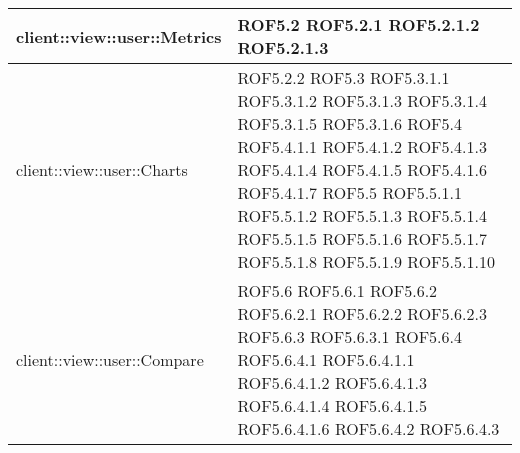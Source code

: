 \begin{center}
\begin{longtable}{| p{11cm} | p{2.5cm} |}
\hline
client::view::user::Metrics & ROF5.2 \newline ROF5.2.1 \newline ROF5.2.1.2 \newline ROF5.2.1.3 \\
\hline
client::view::user::Charts & ROF5.2.2 \newline ROF5.3 \newline ROF5.3.1.1 \newline ROF5.3.1.2 \newline ROF5.3.1.3 \newline ROF5.3.1.4 \newline ROF5.3.1.5 \newline ROF5.3.1.6 \newline ROF5.4 \newline ROF5.4.1.1 \newline ROF5.4.1.2 \newline ROF5.4.1.3 \newline ROF5.4.1.4 \newline ROF5.4.1.5 \newline ROF5.4.1.6 \newline ROF5.4.1.7 \newline ROF5.5 \newline ROF5.5.1.1 \newline ROF5.5.1.2 \newline ROF5.5.1.3 \newline ROF5.5.1.4 \newline ROF5.5.1.5 \newline ROF5.5.1.6 \newline ROF5.5.1.7 \newline ROF5.5.1.8 \newline ROF5.5.1.9 \newline ROF5.5.1.10 \\
\hline
client::view::user::Compare & ROF5.6 \newline ROF5.6.1 \newline ROF5.6.2 \newline ROF5.6.2.1 \newline ROF5.6.2.2 \newline ROF5.6.2.3 \newline ROF5.6.3 \newline ROF5.6.3.1 \newline ROF5.6.4 \newline ROF5.6.4.1 \newline ROF5.6.4.1.1 \newline ROF5.6.4.1.2 \newline ROF5.6.4.1.3 \newline ROF5.6.4.1.4 \newline ROF5.6.4.1.5 \newline ROF5.6.4.1.6 \newline ROF5.6.4.2 \newline ROF5.6.4.3 \\

\end{longtable}
\end{center}

